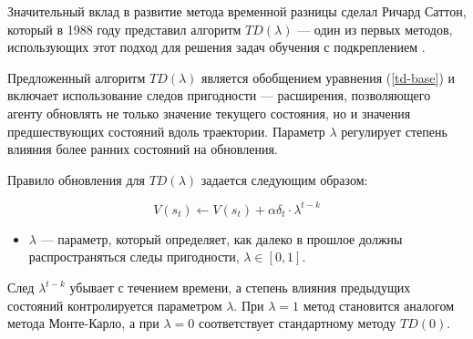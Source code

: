 Значительный вклад в развитие метода временной разницы сделал Ричард Саттон, который в 1988 году представил алгоритм $TD(\lambda)$ — один из первых методов, использующих этот подход для решения задач обучения с подкреплением \cite{td-first-improvement}.

Предложенный алгоритм $TD(\lambda)$ является обобщением уравнения (\ref{td-base}) и включает использование следов пригодности — расширения, позволяющего агенту обновлять не только значение текущего состояния, но и значения предшествующих состояний вдоль траектории. Параметр $\lambda$ регулирует степень влияния более ранних состояний на обновления.

Правило обновления для $TD(\lambda)$ задается следующим образом:

\begin{equation}\label{td-lambda}
    V(s_t) \leftarrow V(s_t) + \alpha \delta_t \cdot \lambda^{t - k}
\end{equation}

\begin{itemize}
    \item $\lambda$ --- параметр, который определяет, как далеко в прошлое должны распространяться следы пригодности, $\lambda \in [0, 1]$.
\end{itemize}

След $\lambda^{t-k}$ убывает с течением времени, а степень влияния предыдущих состояний контролируется параметром $\lambda$. При $\lambda = 1$ метод становится аналогом метода Монте-Карло, а при $\lambda = 0$ соответствует стандартному методу $TD(0)$.
